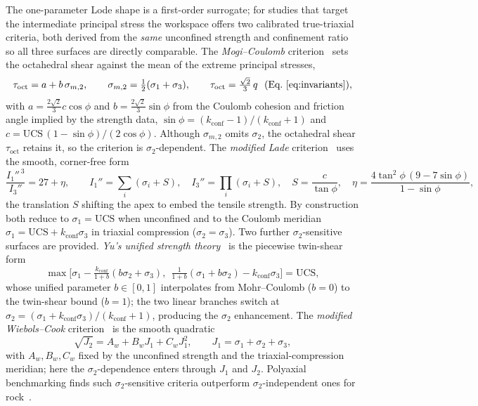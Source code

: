 \documentclass[sn-basic]{sn-jnl}
\begin{document}
The one-parameter Lode shape is a first-order surrogate; for studies that target
the intermediate principal stress the workspace offers two calibrated
true-triaxial criteria, both derived from the \emph{same} unconfined strength and
confinement ratio so all three surfaces are directly comparable. The
\emph{Mogi--Coulomb} criterion~\citep{mogi1971,alajmi2005} sets the octahedral
shear against the mean of the extreme principal stresses,
\begin{equation}
\tau_{\mathrm{oct}}=a+b\,\sigma_{m,2},\qquad
\sigma_{m,2}=\tfrac12(\sigma_1+\sigma_3),\qquad
\tau_{\mathrm{oct}}=\tfrac{\sqrt2}{3}\,q\ \ (\text{Eq.~\eqref{eq:invariants}}),
\label{eq:mogi}
\end{equation}
with $a=\tfrac{2\sqrt2}{3}c\cos\phi$ and $b=\tfrac{2\sqrt2}{3}\sin\phi$ from the
Coulomb cohesion and friction angle implied by the strength data,
$\sin\phi=(k_{\mathrm{conf}}-1)/(k_{\mathrm{conf}}+1)$ and
$c=\mathrm{UCS}\,(1-\sin\phi)/(2\cos\phi)$. Although $\sigma_{m,2}$ omits
$\sigma_2$, the octahedral shear $\tau_{\mathrm{oct}}$ retains it, so the criterion
is $\sigma_2$-dependent. The \emph{modified Lade} criterion~\citep{ewy1999} uses
the smooth, corner-free form
\begin{equation}
\frac{I_1''^{\,3}}{I_3''}=27+\eta,\qquad
I_1''=\textstyle\sum_i(\sigma_i+S),\quad I_3''=\textstyle\prod_i(\sigma_i+S),\quad
S=\frac{c}{\tan\phi},\quad
\eta=\frac{4\tan^2\phi\,(9-7\sin\phi)}{1-\sin\phi},
\label{eq:lade}
\end{equation}
the translation $S$ shifting the apex to embed the tensile strength. By
construction both reduce to $\sigma_1=\mathrm{UCS}$ when unconfined and to the
Coulomb meridian $\sigma_1=\mathrm{UCS}+k_{\mathrm{conf}}\sigma_3$ in triaxial
compression ($\sigma_2=\sigma_3$). Two further $\sigma_2$-sensitive surfaces are
provided. \emph{Yu's unified strength theory}~\citep{yu2002} is the piecewise
twin-shear form
\begin{equation}
\max\!\Big[\sigma_1-\tfrac{k_{\mathrm{conf}}}{1+b}(b\sigma_2+\sigma_3),\ \
\tfrac{1}{1+b}(\sigma_1+b\sigma_2)-k_{\mathrm{conf}}\sigma_3\Big]=\mathrm{UCS},
\label{eq:yu}
\end{equation}
whose unified parameter $b\in[0,1]$ interpolates from Mohr--Coulomb ($b=0$) to the
twin-shear bound ($b=1$); the two linear branches switch at
$\sigma_2=(\sigma_1+k_{\mathrm{conf}}\sigma_3)/(k_{\mathrm{conf}}+1)$, producing
the $\sigma_2$ enhancement. The \emph{modified Wiebols--Cook}
criterion~\citep{wiebols1968} is the smooth quadratic
\begin{equation}
\sqrt{J_2}=A_w+B_w J_1+C_w J_1^{2},\qquad J_1=\sigma_1+\sigma_2+\sigma_3,
\label{eq:wc}
\end{equation}
with $A_w,B_w,C_w$ fixed by the unconfined strength and the triaxial-compression
meridian; here the $\sigma_2$-dependence enters through $J_1$ and $J_2$. Polyaxial
benchmarking finds such $\sigma_2$-sensitive criteria outperform
$\sigma_2$-independent ones for rock~\citep{colmenares2002}.
\end{document}
